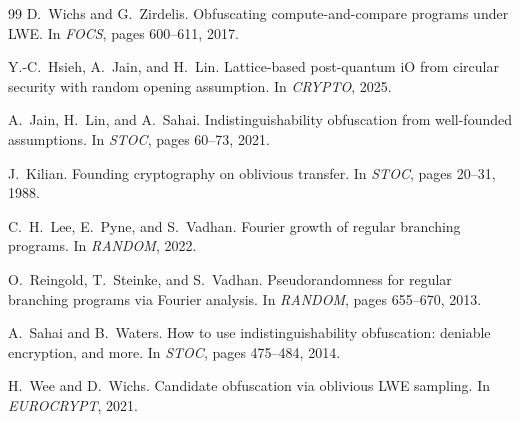 \documentclass[11pt]{article}
\begin{document}
\begin{thebibliography}{99}
D.~Wichs and G.~Zirdelis.
\newblock Obfuscating compute-and-compare programs under LWE.
\newblock In \emph{FOCS}, pages 600--611, 2017.

Y.-C.~Hsieh, A.~Jain, and H.~Lin.
\newblock Lattice-based post-quantum iO from circular security with random
  opening assumption.
\newblock In \emph{CRYPTO}, 2025.

A.~Jain, H.~Lin, and A.~Sahai.
\newblock Indistinguishability obfuscation from well-founded assumptions.
\newblock In \emph{STOC}, pages 60--73, 2021.

J.~Kilian.
\newblock Founding cryptography on oblivious transfer.
\newblock In \emph{STOC}, pages 20--31, 1988.

C.~H.~Lee, E.~Pyne, and S.~Vadhan.
\newblock Fourier growth of regular branching programs.
\newblock In \emph{RANDOM}, 2022.

O.~Reingold, T.~Steinke, and S.~Vadhan.
\newblock Pseudorandomness for regular branching programs via Fourier analysis.
\newblock In \emph{RANDOM}, pages 655--670, 2013.

A.~Sahai and B.~Waters.
\newblock How to use indistinguishability obfuscation: deniable encryption, and
  more.
\newblock In \emph{STOC}, pages 475--484, 2014.

H.~Wee and D.~Wichs.
\newblock Candidate obfuscation via oblivious LWE sampling.
\newblock In \emph{EUROCRYPT}, 2021.

\end{thebibliography}
\end{document}

